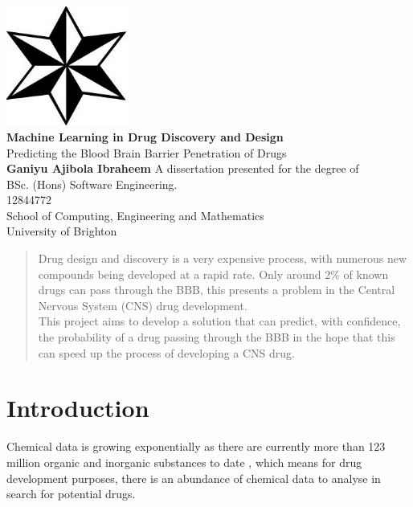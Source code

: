 \documentclass[a4paper,12pt]{report}
\begin{document}
\begin{titlepage}
	\begin{center}
		\includegraphics[scale=1,width=0.3\textwidth]{images/uob_logo} \\
		\huge
		\textbf{Machine Learning in Drug Discovery and Design\\}
		\vspace{0.5cm}
		\Large
		Predicting the Blood Brain Barrier Penetration of Drugs \\
		\vspace{1.5cm}
		\textbf{Ganiyu Ajibola Ibraheem}
		\vfill
		A dissertation presented for the degree of \\
		BSc. (Hons) Software Engineering. \\
		\vspace{0.8cm}
		\large
		12844772 \\
		School of Computing, Engineering and Mathematics \\
		University of Brighton \\
		\date{\today}
	\end{center}
\end{titlepage}

\tableofcontents
\newpage
\listoffigures
\listoftables
\listoflistings
\newpage
{}


\begin{abstract}
	Drug design and discovery is a very expensive process, with numerous new compounds being developed at a rapid rate. Only around 2\% of known drugs can pass through the BBB, this presents a problem in the Central Nervous System (CNS) drug development. \\
	This project aims to develop a solution that can predict, with confidence, the probability of a drug passing through the BBB in the hope that this can speed up the process of developing a CNS drug.
\end{abstract}

\chapter{Introduction}
	Chemical data is growing exponentially as there are currently more than 123 million organic and inorganic substances to date \cite{CAS2016}, which means for drug development purposes, there is an abundance of chemical data to analyse in search for potential drugs. 
	
\end{document}
